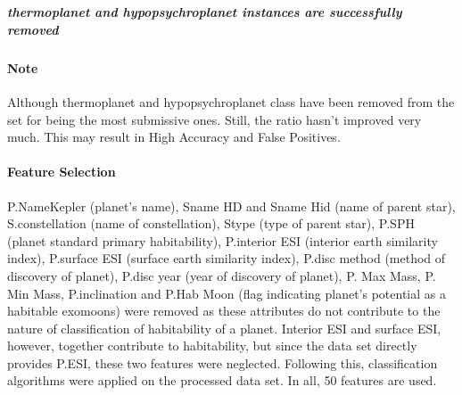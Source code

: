 \documentclass[11pt]{article}
\begin{document}
    \begin{center}
    \end{center}
    { \hspace*{\fill} \\}
    
    \subparagraph{thermoplanet and hypopsychroplanet instances are
successfully
removed}\label{thermoplanet-and-hypopsychroplanet-instances-are-successfully-removed}

    \paragraph{Note}\label{note}

Although thermoplanet and hypopsychroplanet class have been removed from
the set for being the most submissive ones. Still, the ratio hasn't
improved very much. This may result in High Accuracy and False
Positives.

    \paragraph{Feature Selection}\label{feature-selection}

    P.NameKepler (planet's name), Sname HD and Sname Hid (name of parent
star), S.constellation (name of constellation), Stype (type of parent
star), P.SPH (planet standard primary habitability), P.interior ESI
(interior earth similarity index), P.surface ESI (surface earth
similarity index), P.disc method (method of discovery of planet), P.disc
year (year of discovery of planet), P. Max Mass, P. Min Mass,
P.inclination and P.Hab Moon (flag indicating planet's potential as a
habitable exomoons) were removed as these attributes do not contribute
to the nature of classification of habitability of a planet. Interior
ESI and surface ESI, however, together contribute to habitability, but
since the data set directly provides P.ESI, these two features were
neglected. Following this, classification algorithms were applied on the
processed data set. In all, 50 features are used.
\end{document}
